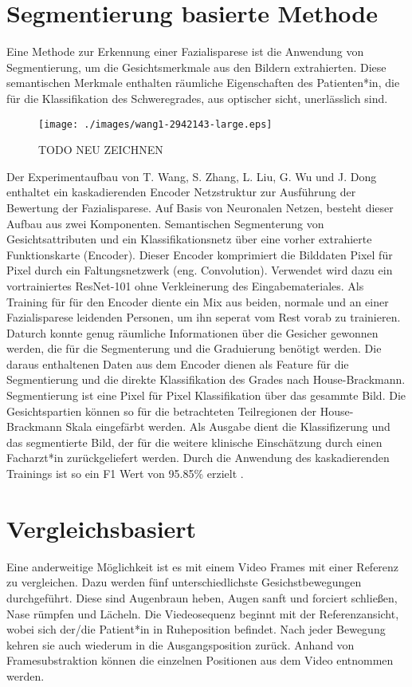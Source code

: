 \section{Segmentierung basierte Methode}\label{segmentation}
Eine Methode zur Erkennung einer Fazialisparese ist die Anwendung von Segmentierung, um die Gesichtsmerkmale aus den Bildern extrahierten. Diese semantischen Merkmale enthalten räumliche Eigenschaften des Patienten*in, die für die Klassifikation des Schweregrades, aus optischer sicht, unerlässlich sind.

\begin{figure}[tb]\centering
  \texttt{[image: ./images/wang1-2942143-large.eps]}
\caption[tmp2]{TODO NEU ZEICHNEN\cite{detection_fp2}}\label{cap:tmp2}
\end{figure}\label{fig:tmp2}

Der Experimentaufbau von T. Wang, S. Zhang, L. Liu, G. Wu und J. Dong enthaltet ein kaskadierenden Encoder Netzstruktur zur Ausführung der Bewertung der Fazialisparese. Auf Basis von Neuronalen Netzen, besteht dieser Aufbau aus zwei Komponenten. Semantischen Segmenterung von Gesichtsattributen und ein Klassifikationsnetz über eine vorher extrahierte Funktionskarte (Encoder). Dieser Encoder komprimiert die Bilddaten Pixel für Pixel durch ein Faltungsnetzwerk (eng. Convolution). Verwendet wird dazu ein vortrainiertes ResNet-101 ohne Verkleinerung des Eingabemateriales. Als Training für für den Encoder diente ein Mix aus beiden, normale und an einer Fazialisparese leidenden Personen, um ihn seperat vom Rest vorab zu trainieren. Daturch konnte genug räumliche Informationen über die Gesicher gewonnen werden, die für die Segmenterung und die Graduierung benötigt werden. Die daraus enthaltenen Daten aus dem Encoder dienen als Feature für die Segmentierung und die direkte Klassifikation des Grades nach House-Brackmann. Segmentierung ist eine Pixel für Pixel Klassifikation über das gesammte Bild. Die Gesichtspartien können so für die betrachteten Teilregionen der House-Brackmann Skala eingefärbt werden. Als Ausgabe dient die Klassifizerung und das segmentierte Bild, der für die weitere klinische Einschätzung durch einen Facharzt*in zurückgeliefert werden. Durch die Anwendung des kaskadierenden Trainings ist so ein F1 Wert von 95.85\% erzielt \cite{detection_fp2}.




\section{Vergleichsbasiert}\label{compare}
Eine anderweitige Möglichkeit ist es mit einem Video Frames mit einer Referenz zu vergleichen. Dazu werden fünf unterschiedlichste Gesichstbewegungen durchgeführt. Diese sind Augenbraun heben, Augen sanft und forciert schließen, Nase rümpfen und Lächeln. Die Viedeosequenz beginnt mit der Referenzansicht, wobei sich der/die Patient*in in Ruheposition befindet. Nach jeder Bewegung kehren sie auch wiederum in die Ausgangsposition zurück. Anhand von Framesubstraktion können die einzelnen Positionen aus dem Video entnommen werden.

